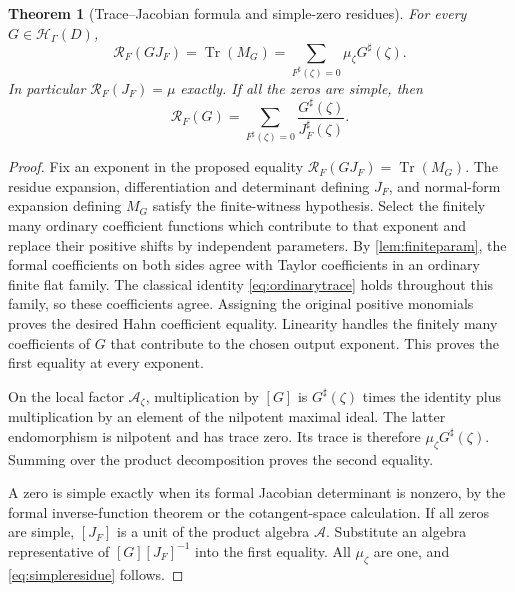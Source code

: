 \documentclass[11pt,letterpaper]{article}
\newtheorem{theorem}{Theorem}[section]
\theoremstyle{definition}
\theoremstyle{remark}
\newcommand{\HH}{\mathcal H}
\newcommand{\Tr}{\operatorname{Tr}}
\newcommand{\sh}{^{\sharp}}
\newcommand{\Hh}{\HH_{\Gamma}}
\newcommand{\RR}{\mathcal R}
\begin{document}
\begin{theorem}[Trace--Jacobian formula and simple-zero residues]\label{thm:trace}
For every $G\in\Hh(D)$,
\begin{equation}\label{eq:tracejac}
 \RR_F(GJ_F)=\Tr(M_G)
       =\sum_{F\sh(\zeta)=0}\mu_\zeta G\sh(\zeta).
\end{equation}
In particular $\RR_F(J_F)=\mu$ exactly. If all the zeros are simple, then
\begin{equation}\label{eq:simpleresidue}
 \RR_F(G)=\sum_{F\sh(\zeta)=0}
          \frac{G\sh(\zeta)}{J_F\sh(\zeta)}.
\end{equation}
\end{theorem}
\begin{proof}
Fix an exponent in the proposed equality $\RR_F(GJ_F)=\Tr(M_G)$. The residue expansion, differentiation and determinant defining $J_F$, and normal-form expansion defining $M_G$ satisfy the finite-witness hypothesis. Select the finitely many ordinary coefficient functions which contribute to that exponent and replace their positive shifts by independent parameters. By \cref{lem:finiteparam}, the formal coefficients on both sides agree with Taylor coefficients in an ordinary finite flat family. The classical identity \eqref{eq:ordinarytrace} holds throughout this family, so these coefficients agree. Assigning the original positive monomials proves the desired Hahn coefficient equality. Linearity handles the finitely many coefficients of $G$ that contribute to the chosen output exponent. This proves the first equality at every exponent.

On the local factor $\mathcal A_\zeta$, multiplication by $[G]$ is $G\sh(\zeta)$ times the identity plus multiplication by an element of the nilpotent maximal ideal. The latter endomorphism is nilpotent and has trace zero. Its trace is therefore $\mu_\zeta G\sh(\zeta)$. Summing over the product decomposition proves the second equality.

A zero is simple exactly when its formal Jacobian determinant is nonzero, by the formal inverse-function theorem or the cotangent-space calculation. If all zeros are simple, $[J_F]$ is a unit of the product algebra $\mathcal A$. Substitute an algebra representative of $[G][J_F]^{-1}$ into the first equality. All $\mu_\zeta$ are one, and \eqref{eq:simpleresidue} follows.
\end{proof}
\end{document}
